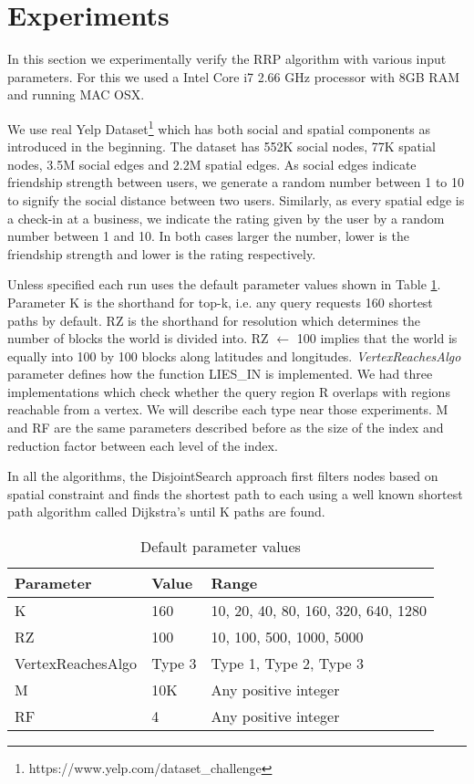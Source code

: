 \section{Experiments}
In this section we experimentally verify the RRP algorithm with various input parameters. For this we used a Intel Core i7 2.66 GHz processor with 8GB RAM and running MAC OSX. 

We use real Yelp Dataset\footnote{https://www.yelp.com/dataset\_challenge} which has both social and spatial components as introduced in the beginning. The dataset has 552K social nodes, 77K spatial nodes, 3.5M social edges and 2.2M spatial edges. As social edges indicate friendship strength between users, we generate a random number between 1 to 10 to signify the social distance between two users. Similarly, as every spatial edge is a check-in at a business, we indicate the rating given by the user by a random number between 1 and 10. In both cases larger the number, lower is the friendship strength and lower is the rating respectively. 

Unless specified each run uses the default parameter values shown in Table \ref{tab:default-param}. Parameter K is the shorthand for top-k, i.e. any query requests 160 shortest paths by default. RZ is the shorthand for resolution which determines the number of blocks the world is divided into. RZ $\gets$ 100 implies that the world is equally into 100 by 100 blocks along latitudes and longitudes. \textit{VertexReachesAlgo} parameter defines how the function LIES\_IN is implemented. We had three implementations which check whether the query region R overlaps with regions reachable from a vertex. We will describe each type near those experiments. M and RF are the same parameters described before as the size of the index and reduction factor between each level of the index.

In all the algorithms, the DisjointSearch approach first filters nodes based on spatial constraint and finds the shortest path to each using a well known shortest path algorithm called Dijkstra's until K paths are found.

\begin{table}[h]
	\caption{Default parameter values}
	\label{tab:default-param}
	\begin{center}
		\renewcommand{\arraystretch}{1.25}
		\begin{tabular}{ l | l | l }
			\hline
			Parameter & Value & Range \\ \hline
			\hline
			K & 160 & 10, 20, 40, 80, 160, 320, 640, 1280 \\
			RZ & 100 & 10, 100, 500, 1000, 5000 \\
			VertexReachesAlgo & Type 3 & Type 1, Type 2, Type 3 \\
			M & 10K & Any positive integer \\
			RF & 4 & Any positive integer \\
			\hline
		\end{tabular}
	\end{center}
\end{table}

